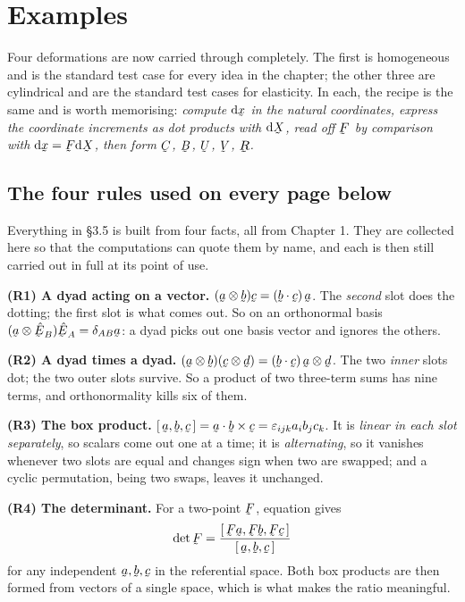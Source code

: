 \section{Examples}\label{sec:examples}

Four deformations are now carried through completely. The first is
homogeneous and is the standard test case for every idea in the chapter;
the other three are cylindrical and are the standard test cases for
elasticity. In each, the recipe is the same and is worth memorising:
\emph{compute $\dl\bx$ in the natural coordinates, express the coordinate
increments as dot products with $\dl\bX$, read off $\bF$ by comparison
with $\dl\bx=\bF\dl\bX$, then form $\bC$, $\bB$, $\bU$, $\bV$, $\bR$.}

\subsection*{The four rules used on every page below}

Everything in \S3.5 is built from four facts, all from Chapter 1. They are
collected here so that the computations can quote them by name, and each is
then still carried out in full at its point of use.

\smallskip\noindent
\textbf{(R1) A dyad acting on a vector.}
$(\ba\otimes\bb)\bc=(\ip\bb\bc)\,\ba$. The \emph{second} slot does the
dotting; the first slot is what comes out. So on an orthonormal basis
$(\ba\otimes\hbE_{B})\hbE_{A}=\dd_{AB}\ba$: a dyad picks out one basis
vector and ignores the others.

\smallskip\noindent
\textbf{(R2) A dyad times a dyad.}
$(\ba\otimes\bb)(\bc\otimes\bd)=(\ip\bb\bc)\,\ba\otimes\bd$. The two
\emph{inner} slots dot; the two outer slots survive. So a product of two
three-term sums has nine terms, and orthonormality kills six of them.

\smallskip\noindent
\textbf{(R3) The box product.} $\tbox\ba\bb\bc=\ip{\ba}{\bb\times\bc}
=\eps_{ijk}a_{i}b_{j}c_{k}$. It is \emph{linear in each slot separately},
so scalars come out one at a time; it is \emph{alternating}, so it vanishes
whenever two slots are equal and changes sign when two are swapped; and a
cyclic permutation, being two swaps, leaves it unchanged.

\smallskip\noindent
\textbf{(R4) The determinant.} For a two-point $\bF$, equation 
gives
\[
   \det\bF=\frac{\tbox{\bF\ba}{\bF\bb}{\bF\bc}}{\tbox\ba\bb\bc}
\]
for any independent $\ba,\bb,\bc$ in the referential space. Both box
products are then formed from vectors of a single space, which is what
makes the ratio meaningful.


